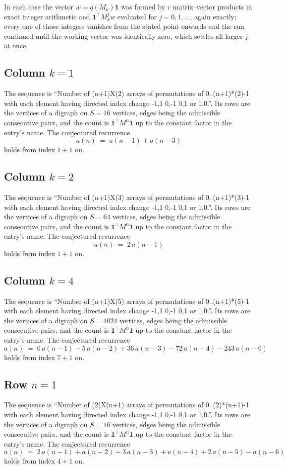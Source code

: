 \documentclass[11pt,a4paper]{article}
\theoremstyle{plain}
\theoremstyle{definition}
\begin{document}
In each case the vector $w=q(M_k)\mathbf{1}$ was formed by $r$ matrix--vector products in
exact integer arithmetic and $\mathbf{1}^{\!\top}M_k^{j}w$ evaluated for $j=0,1,\dots$,
again exactly; every one of those integers vanishes from the stated point onwards and the run
continued until the working vector was identically zero, which settles all larger $j$ at once.

\subsection*{Column $k$$=1$}
The sequence is ``Number of (n+1)X(2) arrays of permutations of 0..(n+1)*(2)-1 with each element having directed index change -1,1 0,-1 0,1 or 1,0.''. Its rows are the vertices of a digraph on
$S=16$ vertices, edges being the admissible consecutive pairs, and the count is
$\mathbf{1}^{\!\top}M^{n}\mathbf{1}$ up to the constant factor in the entry's name.
The conjectured recurrence
\[
a(n)\;=\;a(n-1) + a(n-3)
\]
holds from index $1+1$ on.

\subsection*{Column $k$$=2$}
The sequence is ``Number of (n+1)X(3) arrays of permutations of 0..(n+1)*(3)-1 with each element having directed index change -1,1 0,-1 0,1 or 1,0.''. Its rows are the vertices of a digraph on
$S=64$ vertices, edges being the admissible consecutive pairs, and the count is
$\mathbf{1}^{\!\top}M^{n}\mathbf{1}$ up to the constant factor in the entry's name.
The conjectured recurrence
\[
a(n)\;=\;2\,a(n-1)
\]
holds from index $1+1$ on.

\subsection*{Column $k$$=4$}
The sequence is ``Number of (n+1)X(5) arrays of permutations of 0..(n+1)*(5)-1 with each element having directed index change -1,1 0,-1 0,1 or 1,0.''. Its rows are the vertices of a digraph on
$S=1024$ vertices, edges being the admissible consecutive pairs, and the count is
$\mathbf{1}^{\!\top}M^{n}\mathbf{1}$ up to the constant factor in the entry's name.
The conjectured recurrence
\[
a(n)\;=\;6\,a(n-1) - 5\,a(n-2) + 36\,a(n-3) - 72\,a(n-4) - 243\,a(n-6)
\]
holds from index $7+1$ on.

\subsection*{Row $n$$=1$}
The sequence is ``Number of (2)X(n+1) arrays of permutations of 0..(2)*(n+1)-1 with each element having directed index change -1,1 0,-1 0,1 or 1,0.''. Its rows are the vertices of a digraph on
$S=16$ vertices, edges being the admissible consecutive pairs, and the count is
$\mathbf{1}^{\!\top}M^{n}\mathbf{1}$ up to the constant factor in the entry's name.
The conjectured recurrence
\[
a(n)\;=\;2\,a(n-1) + a(n-2) - 3\,a(n-3) + a(n-4) + 2\,a(n-5) - a(n-6)
\]
holds from index $4+1$ on.
\end{document}
